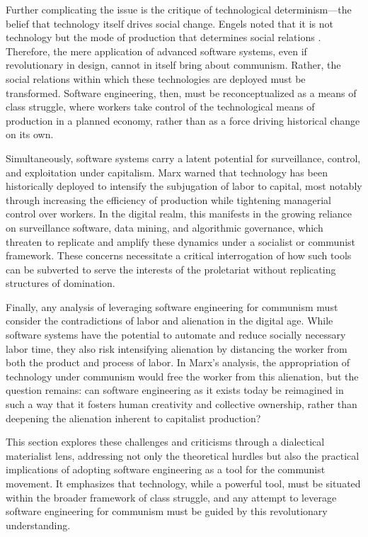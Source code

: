 \begin{refsection}
Further complicating the issue is the critique of technological determinism—the belief that technology itself drives social change. Engels noted that it is not technology but the mode of production that determines social relations \cite[pp.~364]{engels_anti-duhring}. Therefore, the mere application of advanced software systems, even if revolutionary in design, cannot in itself bring about communism. Rather, the social relations within which these technologies are deployed must be transformed. Software engineering, then, must be reconceptualized as a means of class struggle, where workers take control of the technological means of production in a planned economy, rather than as a force driving historical change on its own.

Simultaneously, software systems carry a latent potential for surveillance, control, and exploitation under capitalism. Marx warned that technology has been historically deployed to intensify the subjugation of labor to capital, most notably through increasing the efficiency of production while tightening managerial control over workers. In the digital realm, this manifests in the growing reliance on surveillance software, data mining, and algorithmic governance, which threaten to replicate and amplify these dynamics under a socialist or communist framework. These concerns necessitate a critical interrogation of how such tools can be subverted to serve the interests of the proletariat without replicating structures of domination.

Finally, any analysis of leveraging software engineering for communism must consider the contradictions of labor and alienation in the digital age. While software systems have the potential to automate and reduce socially necessary labor time, they also risk intensifying alienation by distancing the worker from both the product and process of labor. In Marx's analysis, the appropriation of technology under communism would free the worker from this alienation, but the question remains: can software engineering as it exists today be reimagined in such a way that it fosters human creativity and collective ownership, rather than deepening the alienation inherent to capitalist production?

This section explores these challenges and criticisms through a dialectical materialist lens, addressing not only the theoretical hurdles but also the practical implications of adopting software engineering as a tool for the communist movement. It emphasizes that technology, while a powerful tool, must be situated within the broader framework of class struggle, and any attempt to leverage software engineering for communism must be guided by this revolutionary understanding.


\end{refsection}
